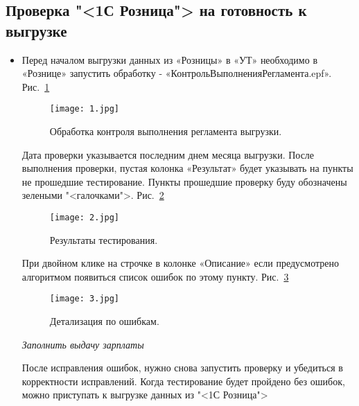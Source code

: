\subsection{Проверка "<1С Розница"> на готовность к выгрузке}
\begin{itemize}	
	\item Перед началом выгрузки данных из «Розницы» в «УТ» необходимо в «Рознице» запустить обработку - «КонтрольВыполненияРегламента.epf».
	 Рис.~\ref{ris:1.jpg}	
	\begin{figure}[H]
		\texttt{[image: 1.jpg]}
		\caption{Обработка контроля выполнения регламента выгрузки.}
		\label{ris:1.jpg}
	\end{figure}
Дата проверки указывается последним днем месяца выгрузки. После выполнения проверки, пустая колонка «Результат» будет указывать на пункты не прошедшие тестирование. Пункты прошедшие проверку буду обозначены зелеными "<галочками">.
 Рис.~\ref{ris:2.jpg}	
	\begin{figure}[H]
		\texttt{[image: 2.jpg]}
		\caption{Результаты тестирования.}
		\label{ris:2.jpg}
	\end{figure}
При двойном клике на строчке в колонке «Описание» если предусмотрено алгоритмом появиться список ошибок по этому пункту.
 Рис.~\ref{ris:3.jpg}
	\begin{figure}[H]
		\texttt{[image: 3.jpg]}
		\caption{Детализация по ошибкам.}
		\label{ris:3.jpg}
	\end{figure}
%
\emph{\color{Emerald}Заполнить выдачу зарплаты}
\par
После исправления ошибок,  нужно снова запустить проверку и убедиться в корректности исправлений. 
Когда тестирование будет пройдено без ошибок, можно приступать к выгрузке данных из "<1С Розница">
	
\end{itemize}
